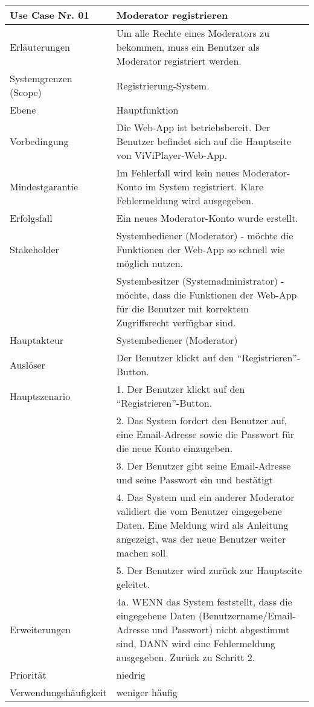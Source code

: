 \begin{tabularx}{\linewidth}{|l|X|}
	\hline
	Use Case Nr. 01			& \textbf{Moderator registrieren} \\ \hline
	Erläuterungen			& Um alle Rechte eines Moderators zu bekommen, muss ein 
							Benutzer als Moderator registriert werden. \\ \hline
	Systemgrenzen (Scope)	& Registrierung-System. \\ \hline
	Ebene					& Hauptfunktion \\ \hline
	Vorbedingung			& Die Web-App ist betriebsbereit. Der Benutzer befindet sich auf die 
							  Hauptseite von ViViPlayer-Web-App. \\ \hline
	Mindestgarantie			& Im Fehlerfall wird kein neues Moderator-Konto im System 
	                          registriert. Klare Fehlermeldung wird ausgegeben. \\ \hline
	Erfolgsfall  			& Ein neues Moderator-Konto wurde erstellt. \\ \hline
	Stakeholder				& Systembediener (Moderator) - möchte die Funktionen der Web-App so 
							  schnell wie möglich nutzen. \\
							& Systembesitzer (Systemadministrator) - möchte, dass die Funktionen 
							  der Web-App für die Benutzer mit korrektem Zugriffsrecht verfügbar sind.\\ \hline
	Hauptakteur				& Systembediener (Moderator) \\ \hline
	Auslöser				& Der Benutzer klickt auf den ``Registrieren''-Button. \\ \hline	
	Hauptszenario			& 1. Der Benutzer klickt auf den ``Registrieren''-Button. \\
							& 2. Das System fordert den Benutzer auf, eine Email-Adresse 
							  sowie die Passwort für die neue Konto einzugeben. \\
							& 3. Der Benutzer gibt seine Email-Adresse und seine Passwort 
							  ein und bestätigt \\
							& 4. Das System und ein anderer Moderator validiert die vom 
							  Benutzer eingegebene Daten. Eine Meldung wird als 
							  Anleitung angezeigt, was der neue Benutzer weiter machen soll. \\
							& 5. Der Benutzer wird zurück zur Hauptseite geleitet. 
							  \\ \hline
	Erweiterungen			& 4a. WENN das System feststellt, dass die eingegebene Daten 
							  (Benutzername/Email-Adresse und Passwort) nicht abgestimmt sind, DANN wird eine Fehlermeldung ausgegeben. Zurück zu Schritt 2. \\ \hline
	Priorität				& niedrig \\ \hline
	Verwendungshäufigkeit	& weniger häufig \\ \hline
\end{tabularx}
